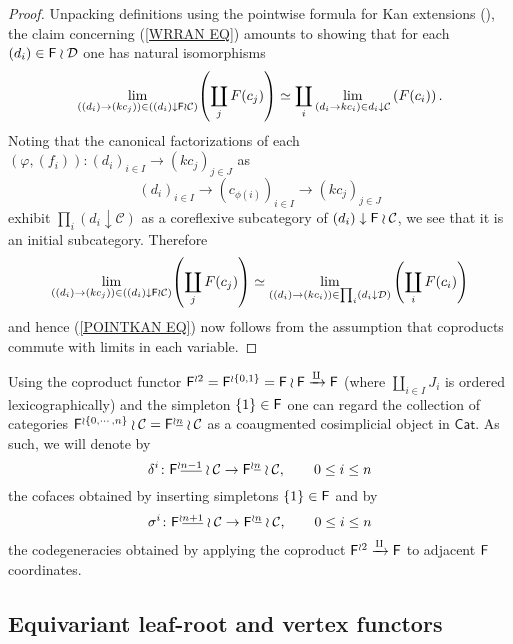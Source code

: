 \documentclass[a4paper,10pt]{article}%
\begin{document}
\begin{proof}
	Unpacking definitions using the pointwise formula for Kan extensions (\cite[X.3.1]{McL}), the claim concerning (\ref{WRRAN EQ}) amounts to showing that for each $(d_i) \in \mathsf{F} \wr \mathcal{D}$ one has natural isomorphisms
	\begin{equation}\label{POINTKAN EQ}
	\underset{((d_i) \to (kc_j))\in
	\left( (d_i) \downarrow \mathsf{F} \wr \mathcal{C} \right) }{\lim} {\left(\coprod_j{F(c_j)}\right)}
		\simeq	
	\coprod_i \underset{(d_i  \to kc_i) \in d_i \downarrow \mathcal{C}}{\lim}
	\left(F(c_i)\right).
	\end{equation}
Noting that the canonical factorizations of each $(\varphi,(f_i))\colon (d_i)_{i \in I} \to (k c_j)_{j \in J}$ as
\[(d_i)_{i\in I} \to (c_{\phi(i)})_{i \in I} \to (k c_j)_{j \in J}\]
exhibit $\prod_{i}{(d_i\downarrow \mathcal{C})}$ as a coreflexive subcategory of $(d_i)\downarrow \mathsf{F} \wr \mathcal{C}$, we see that it is an initial subcategory. Therefore
	\[
	\underset{((d_i) \to (kc_j))\in
	\left( (d_i)\downarrow \mathsf{F} \wr \mathcal{C} \right) }{\lim} {\left(\coprod_j{F(c_j)}\right)}
		\simeq	
	\underset{((d_i) \to (kc_i))\in
	\prod_{i} \left( {d_i \downarrow \mathcal{D}} \right)}{\lim}
	\left(\coprod_i{F(c_i)}\right)
	\]
and hence (\ref{POINTKAN EQ}) now follows from the assumption that coproducts commute with limits in each variable.
\end{proof}

\begin{notation}
Using the coproduct functor $\mathsf{F}^{\wr 2} = \mathsf{F}^{\wr \{{0,1\}}} =\mathsf{F} \wr \mathsf{F} \xrightarrow{\amalg} \mathsf{F}$ (where $\coprod_{i\in I} J_i$ is ordered lexicographically) and the simpleton $\{1\} \in \mathsf{F}$
one can regard the collection of categories 
$\mathsf{F}^{\wr \{0,\cdots,n\}} \wr \mathcal{C} = \mathsf{F}^{\wr \underline{n}} \wr \mathcal{C}$
 as a coaugmented cosimplicial object in $\mathsf{Cat}$.
As such, we will denote by
\[
	\delta^i\colon \mathsf{F}^{\wr \underline{n-1}} \wr \mathcal{C} \to \mathsf{F}^{\wr \underline{n}} \wr \mathcal{C}, \qquad 0 \leq i \leq n
\]
the cofaces obtained by inserting simpletons $\{1\} \in \mathsf{F}$ and by 
\[
	\sigma^i \colon \mathsf{F}^{\wr \underline{n+1}} \wr \mathcal{C} \to \mathsf{F}^{\wr \underline{n}} \wr \mathcal{C}, \qquad 0 \leq i \leq n
\]
the codegeneracies obtained by applying the coproduct 
$\mathsf{F}^{\wr 2} \xrightarrow{\amalg} \mathsf{F}$ to adjacent 
$\mathsf{F}$ coordinates.
\end{notation}



\subsection{Equivariant leaf-root and vertex functors}
\end{document}
